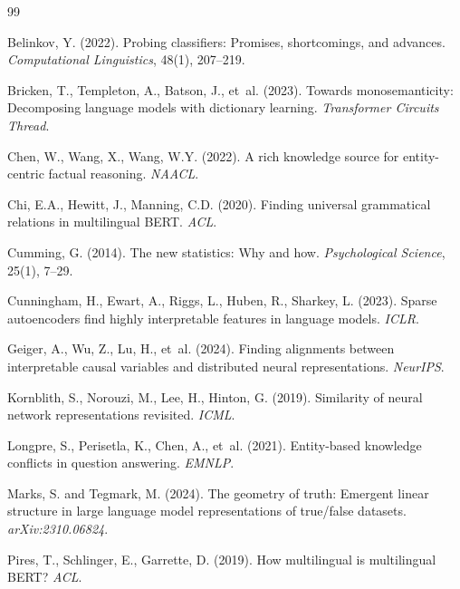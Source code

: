 \documentclass{article}
\begin{document}

\begin{thebibliography}{99}

Belinkov, Y. (2022).
Probing classifiers: Promises, shortcomings, and advances.
\emph{Computational Linguistics}, 48(1), 207--219.

Bricken, T., Templeton, A., Batson, J., et~al. (2023).
Towards monosemanticity: Decomposing language models with dictionary learning.
\emph{Transformer Circuits Thread}.

Chen, W., Wang, X., Wang, W.Y. (2022).
A rich knowledge source for entity-centric factual reasoning.
\emph{NAACL}.

Chi, E.A., Hewitt, J., Manning, C.D. (2020).
Finding universal grammatical relations in multilingual BERT.
\emph{ACL}.

Cumming, G. (2014).
The new statistics: Why and how.
\emph{Psychological Science}, 25(1), 7--29.

Cunningham, H., Ewart, A., Riggs, L., Huben, R., Sharkey, L. (2023).
Sparse autoencoders find highly interpretable features in language models.
\emph{ICLR}.

Geiger, A., Wu, Z., Lu, H., et~al. (2024).
Finding alignments between interpretable causal variables and distributed neural representations.
\emph{NeurIPS}.

Kornblith, S., Norouzi, M., Lee, H., Hinton, G. (2019).
Similarity of neural network representations revisited.
\emph{ICML}.

Longpre, S., Perisetla, K., Chen, A., et~al. (2021).
Entity-based knowledge conflicts in question answering.
\emph{EMNLP}.

Marks, S. and Tegmark, M. (2024).
The geometry of truth: Emergent linear structure in large language model representations of true/false datasets.
\emph{arXiv:2310.06824}.

Pires, T., Schlinger, E., Garrette, D. (2019).
How multilingual is multilingual BERT?
\emph{ACL}.


\end{thebibliography}
\end{document}
